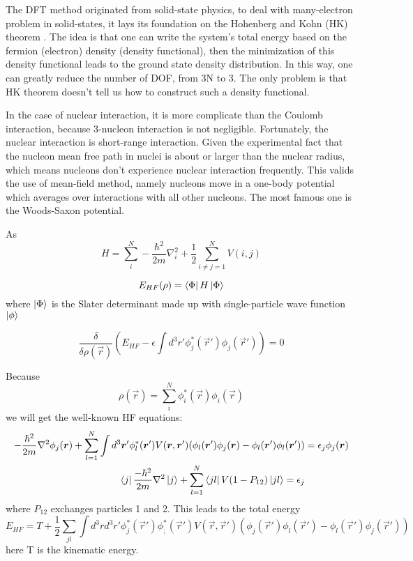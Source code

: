 The DFT method originated from solid-state physics, to deal with many-electron
problem in solid-states, it lays its foundation on the Hohenberg
and Kohn (HK) theorem \cite{PhysRevC.57.3430}. The idea is that one can write
the system's total energy based on the fermion (electron) density (density functional), 
then the minimization of this density functional leads to the ground state 
density distribution. In this way, one can greatly reduce the number of DOF, 
from 3N to 3. The only problem is that HK theorem 
doesn't tell us how to construct such a density functional.

In the case of nuclear interaction, it is more complicate than the Coulomb interaction, 
because 3-nucleon interaction is not negligible. Fortunately, the nuclear interaction
is short-range interaction. Given the experimental fact that the nucleon mean
free path in nuclei is about or larger than the nuclear radius, which means
nucleons don't experience nuclear interaction frequently. This valids the use
of mean-field method, namely nucleons move in a one-body potential which averages 
over interactions with all other nucleons. The most famous one is the Woods-Saxon
potential.

As 
\begin{equation}
    H = \sum_i^N -\frac{\hbar^2}{2m}\nabla_i^2 + \frac{1}{2} \sum_{i\neq j=1}^N V(i, j)
\end{equation}

\begin{equation}
    E_{HF}(\rho) = \bra{\Phi} H \ket{\Phi}
\end{equation}
where $\ket{\Phi}$ is the Slater determinant made up with single-particle wave 
function $\ket{\phi}$

\begin{equation}
    \frac{\delta}{\delta\rho(\vec{r})} \left( E_{HF} - \epsilon\int d^3r' \phi^*_j(\vec{r}')\phi_j(\vec{r}') \right) = 0
\end{equation}

Because 
\begin{equation}
    \rho(\vec{r}) = \sum_i^N \phi_i^*(\vec{r})\phi_i(\vec{r})
\end{equation}
we will get the well-known HF equations:
\begin{equation}
    \begin{aligned}
	-\frac{\hbar^2}{2m}\nabla^2\phi_j(\boldsymbol{r}) 
	+ \sum_{l=1}^N \int d^3\boldsymbol{r}' \phi^*_l(\boldsymbol{r}') V(\boldsymbol{r}, \boldsymbol{r}') (\phi_l(\boldsymbol{r}')\phi_j(\boldsymbol{r}) - \phi_l(\boldsymbol{r}')\phi_l(\boldsymbol{r}'))
	&= \epsilon_j\phi_j(\boldsymbol{r})	\\
	\bra{j}\frac{-\hbar^2}{2m}\nabla^2\ket{j} + \sum_{l=1}^N \bra{jl}V(1-P_{12})\ket{jl} = \epsilon_j
    \end{aligned}
\end{equation}
where $P_{12}$ exchanges particles 1 and 2. This leads to the total energy
\begin{equation}
    E_{HF} = T + \frac{1}{2}\sum_{jl} \int d^3r d^3r' \phi_j^*(\vec{r}')\phi_;^*(\vec{r}')V(\vec{r}, \vec{r}') (\phi_j(\vec{r}')\phi_l(\vec{r}') - \phi_l(\vec{r}')\phi_j(\vec{r}'))
\end{equation}
here T is the kinematic energy.

